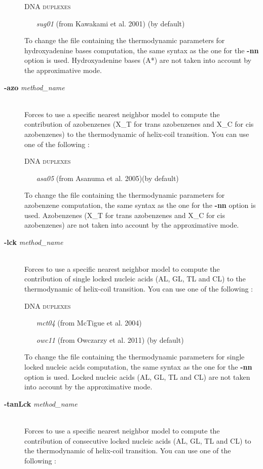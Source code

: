 \documentclass{article}
\begin{document}
\begin{description}
  \textsc{DNA duplexes}
    \begin{itemize}
    \item [\textit{sug01}] (from Kawakami et al. 2001) (by default)
    \end{itemize}
  To change the file containing the thermodynamic parameters for hydroxyadenine bases computation, the same syntax as the one for the \textbf{-nn} option is used.
  Hydroxyadenine bases (A*) are not taken into account by the approximative mode.
\item [\textbf{-azo} \textit{method\_name}]\mbox{}\\ 
  Forces to use a specific nearest neighbor model to compute the contribution of azobenzenes (X\_T for trans azobenzenes and X\_C for cis azobenzenes) to the thermodynamic 
  of helix-coil transition. 
  You can use one of the following :
  
  \textsc{DNA duplexes}
    \begin{itemize}
    \item [\textit{asa05}] (from Asanuma et al. 2005)(by default)
    \end{itemize}
  To change the file containing the thermodynamic parameters for azobenzene computation, the same syntax as the one for the \textbf{-nn} option is used.
  Azobenzenes (X\_T for trans azobenzenes and X\_C for cis azobenzenes) are not taken into account by the approximative mode.
\item [\textbf{-lck} \textit{method\_name}]\mbox{}\\ 
  Forces to use a specific nearest neighbor model to compute the contribution of single locked nucleic acids (AL, GL, TL and CL) to the thermodynamic 
  of helix-coil transition. 
  You can use one of the following :
  
  \textsc{DNA duplexes}
    \begin{itemize}
    \item [\textit{mct04}] (from McTigue et al. 2004)
    \item [\textit{owc11}] (from Owczarzy et al. 2011) (by default)
    \end{itemize}
  To change the file containing the thermodynamic parameters for single locked nucleic acids computation, the same syntax as the one for the \textbf{-nn} option is used.
  Locked nucleic acids (AL, GL, TL and CL) are not taken into account by the approximative mode.
  \item [\textbf{-tanLck} \textit{method\_name}]\mbox{}\\ 
  Forces to use a specific nearest neighbor model to compute the contribution of consecutive locked nucleic acids (AL, GL, TL and CL) to the thermodynamic 
  of helix-coil transition. 
  You can use one of the following :
  

\end{description}
\end{document}
